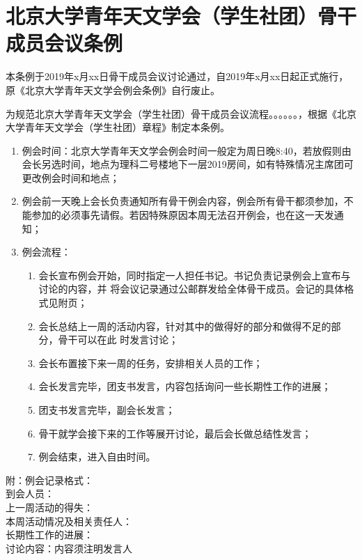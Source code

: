 \chapter{北京大学青年天文学会（学生社团）骨干成员会议条例}

本条例于2019年x月xx日骨干成员会议讨论通过，自2019年x月xx日起正式施行，原《北京大学青年天文学会例会条例》自行废止。

为规范北京大学青年天文学会（学生社团）骨干成员会议流程。。。。。。，根据《北京大学青年天文学会（学生社团）章程》制定本条例。

\begin{enumerate}
    \item 例会时间：北京大学青年天文学会例会时间一般定为周日晚8:40，若放假则由会长另选时间，地点为理科二号楼地下一层2019房间，如有特殊情况主席团可更改例会时间和地点；
    
    \item 例会前一天晚上会长负责通知所有骨干例会内容，例会所有骨干都须参加，不能参加的必须事先请假。若因特殊原因本周无法召开例会，也在这一天发通知；
    
    \item 例会流程：
    
    \begin{enumerate}
        \item 会长宣布例会开始，同时指定一人担任书记。书记负责记录例会上宣布与讨论的内容，并 将会议记录通过公邮群发给全体骨干成员。会记的具体格式见附页；
        \item 会长总结上一周的活动内容，针对其中的做得好的部分和做得不足的部分，骨干可以在此 时发言讨论；
        \item 会长布置接下来一周的任务，安排相关人员的工作；
        \item 会长发言完毕，团支书发言，内容包括询问一些长期性工作的进展；
        \item 团支书发言完毕，副会长发言；
        \item 骨干就学会接下来的工作等展开讨论，最后会长做总结性发言；
        \item 例会结束，进入自由时间。
    \end{enumerate}
    
\end{enumerate}

\noindent 附：例会记录格式：\\
到会人员：\\
上一周活动的得失：\\
本周活动情况及相关责任人：\\
长期性工作的进展：\\
讨论内容：内容须注明发言人
